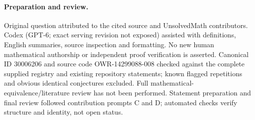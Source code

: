 \documentclass[11pt]{article}
\begin{document}
\paragraph{Preparation and review.}
Original question attributed to the cited source and UnsolvedMath contributors. Codex (GPT-6; exact serving revision not exposed) assisted with definitions, English summaries, source inspection and formatting. No new human mathematical authorship or independent proof verification is asserted. Canonical ID 30006206 and source code OWR-14299088-008 checked against the complete supplied registry and existing repository statements; known flagged repetitions and obvious identical conjectures excluded. Full mathematical-equivalence/literature review has not been performed. Statement preparation and final review followed contribution prompts C and D; automated checks verify structure and identity, not open status.
\label{end:30006206}
\end{document}
